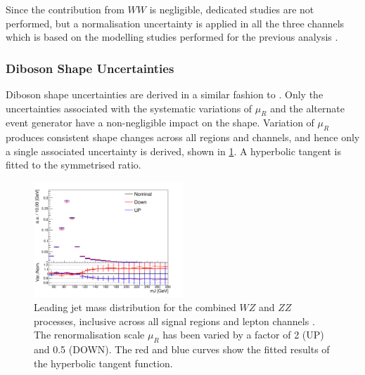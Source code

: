 Since the contribution from $WW$ is negligible, dedicated studies are not performed, but a  normalisation uncertainty is applied in all the three channels which is based on the modelling studies performed for the previous analysis \cite{HIGG-2018-04}.



\subsubsection{Diboson Shape Uncertainties}

Diboson shape uncertainties are derived in a similar fashion to \Vjets.
Only the uncertainties associated with the systematic variations of $\mu_R$ and the alternate event generator have a non-negligible impact on the \mJ shape.
Variation of $\mu_R$ produces consistent \mJ shape changes across all regions and channels, and hence only a single associated uncertainty is derived, shown in \cref{fig:VV_muRFit}.
A hyperbolic tangent is fitted to the symmetrised ratio.

\begin{figure}[!htbp]
  \centering
  \includegraphics[width=0.5\textwidth]{chapters/6.vhbb_boosted/figs/012L_VV_2tag1pfat0pjet_ptvinc_SR_noaddbjetsr_mJIncl_SysMUR.pdf}
  \caption{
    Leading \largeR jet mass distribution for the combined $WZ$ and $ZZ$ processes, inclusive across all signal regions and lepton channels \cite{Dao:2688371}.
    The renormalisation scale $\mu_R$ has been varied by a factor of 2 (UP) and 0.5 (DOWN).
    The red and blue curves show the fitted results of the hyperbolic tangent function.
  }
  \label{fig:VV_muRFit}
\end{figure}

